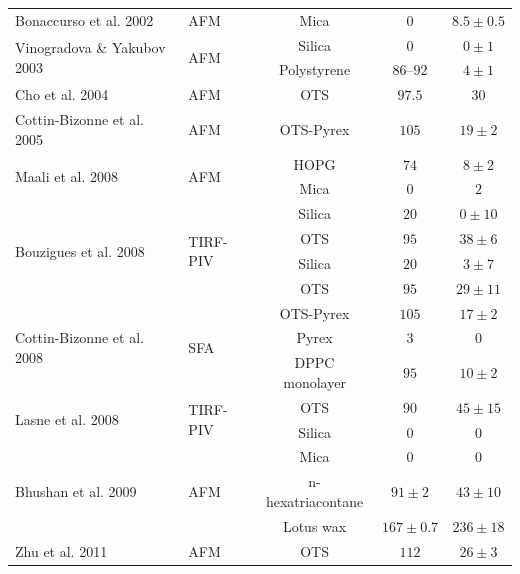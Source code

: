 \documentclass[journal=jacsat,manuscript=article]{achemso}
\begin{document}
\begin{table}
{{\begin{tabular}{llccc}
Bonaccurso et al. 2002\cite{Bonaccurso2002-nf} & AFM & Mica & $0$ & $8.5 \pm 0.5$ \\
\cline{1-5}

\multirow{2}{*}{Vinogradova \& Yakubov 2003\cite{Vinogradova2003-gh}} & \multirow{2}{*}{AFM} & Silica & $0$ & $0 \pm 1$ \\
 &  & Polystyrene & $86$--$92$ & $4 \pm 1$ \\
\cline{1-5}

Cho et al. 2004\cite{Cho2004-it} & AFM & OTS & $97.5$ & $30$ \\
\cline{1-5}

Cottin-Bizonne et al. 2005\cite{Cottin-Bizonne2005-kj} & AFM & OTS-Pyrex & $105$ & $19 \pm 2$ \\
\cline{1-5}

\multirow{2}{*}{Maali et al. 2008\cite{Maali2008-rd}} & \multirow{2}{*}{AFM} & HOPG & $74$ & $8 \pm 2$ \\
 &  & Mica & $0$ & $2$ \\
\cline{1-5}

\multirow{4}{*}{Bouzigues et al. 2008\cite{Bouzigues2008-xn}} & \multirow{4}{*}{TIRF-PIV} & Silica & $20$ & $0 \pm 10$ \\
 &  & OTS & $95$ & $38 \pm 6$ \\
 &  & Silica & $20$ & $3 \pm 7$ \\
 &  & OTS & $95$ & $29 \pm 11$ \\
\cline{1-5}

\multirow{3}{*}{Cottin-Bizonne et al. 2008\cite{Cottin-Bizonne2008-nc}} & \multirow{3}{*}{SFA} & OTS-Pyrex & $105$ & $17 \pm 2$ \\
 &  & Pyrex & $3$ & $0$ \\
 &  & DPPC monolayer & $95$ & $10 \pm 2$ \\
\cline{1-5}

\multirow{2}{*}{Lasne et al. 2008\cite{Lasne2008-qt}} & \multirow{2}{*}{TIRF-PIV} & OTS & $90$ & $45 \pm 15$ \\
 &  & Silica & $0$ & $0$ \\
\cline{1-5}

\multirow{3}{*}{Bhushan et al. 2009\cite{Bhushan2009-yz}} & \multirow{3}{*}{AFM} & Mica & $0$ & $0$ \\
 &  & n-hexatriacontane & $91 \pm 2$ & $43 \pm 10$ \\
 &  & Lotus wax & $167 \pm 0.7$ & $236 \pm 18$ \\
\cline{1-5}

Zhu et al. 2011\cite{Zhu2011-je} & AFM & OTS & $112$ & $26 \pm 3$ \\
\cline{1-5}


\end{tabular}}}
\end{table}
\end{document}
